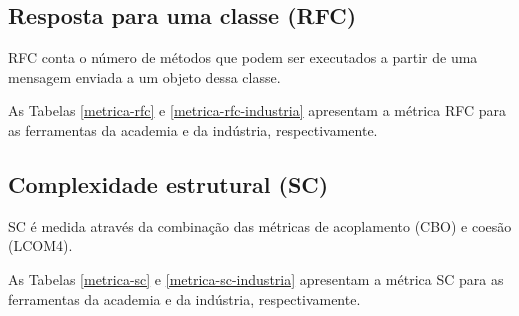 \subsection{Resposta para uma classe (RFC)}

RFC conta o número de métodos que podem ser executados a partir de uma
mensagem enviada a um objeto dessa classe.

As Tabelas \ref{metrica-rfc} e \ref{metrica-rfc-industria} apresentam a
métrica RFC para as ferramentas da academia e da indústria, respectivamente.



\subsection{Complexidade estrutural (SC)}

SC é medida através da combinação das métricas de acoplamento (CBO) e coesão
(LCOM4).

As Tabelas \ref{metrica-sc} e \ref{metrica-sc-industria} apresentam a
métrica SC para as ferramentas da academia e da indústria, respectivamente.



